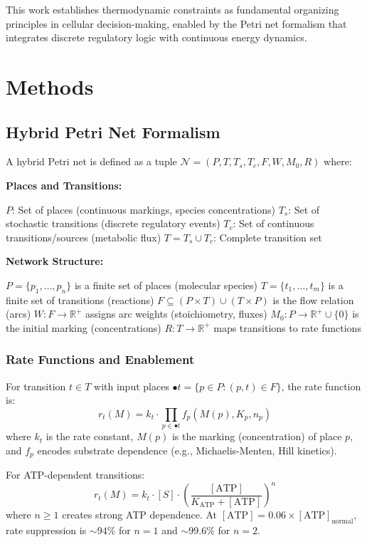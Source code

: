 \documentclass[twocolumn,11pt]{article}
\begin{document}
This work establishes thermodynamic constraints as fundamental organizing principles in cellular decision-making, enabled by the Petri net formalism that integrates discrete regulatory logic with continuous energy dynamics.

\section{Methods}

\subsection{Hybrid Petri Net Formalism}

A hybrid Petri net is defined as a tuple $\mathcal{N} = (P, T, T_s, T_c, F, W, M_0, R)$ where:

\textbf{Places and Transitions:}

$P$: Set of places (continuous markings, species concentrations)
$T_s$: Set of stochastic transitions (discrete regulatory events)
$T_c$: Set of continuous transitions/sources (metabolic flux)
$T = T_s \cup T_c$: Complete transition set


\textbf{Network Structure:}

$P = \{p_1, \ldots, p_n\}$ is a finite set of places (molecular species)
$T = \{t_1, \ldots, t_m\}$ is a finite set of transitions (reactions)
$F \subseteq (P \times T) \cup (T \times P)$ is the flow relation (arcs)
$W: F \to \mathbb{R}^+$ assigns arc weights (stoichiometry, fluxes)
$M_0: P \to \mathbb{R}^+ \cup \{0\}$ is the initial marking (concentrations)
$R: T \to \mathbb{R}^+$ maps transitions to rate functions


\subsubsection{Rate Functions and Enablement}

For transition $t \in T$ with input places $\bullet t = \{p \in P : (p, t) \in F\}$, the rate function is:
\begin{equation}
    r_t(M) = k_t \cdot \prod_{p \in \bullet t} f_p(M(p), K_p, n_p)
\end{equation}
where $k_t$ is the rate constant, $M(p)$ is the marking (concentration) of place $p$, and $f_p$ encodes substrate dependence (e.g., Michaelis-Menten, Hill kinetics).

For ATP-dependent transitions:
\begin{equation}
    r_t(M) = k_t \cdot [S] \cdot \left(\frac{[\text{ATP}]}{K_{\text{ATP}} + [\text{ATP}]}\right)^{n}
\end{equation}
where $n \geq 1$ creates strong ATP dependence. At $[\text{ATP}] = 0.06 \times [\text{ATP}]_{\text{normal}}$, rate suppression is $\sim 94\%$ for $n=1$ and $\sim 99.6\%$ for $n=2$.
\end{document}
